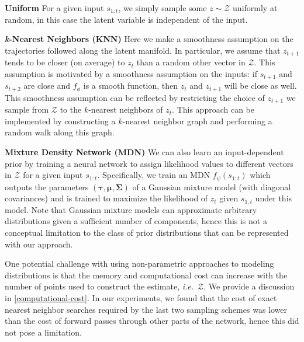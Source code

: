 \documentclass{article}
\begin{document}


\textbf{Uniform} \quad
For a given input $s_{1:t}$, we simply sample some $z \sim \mathcal{Z}$ uniformly at random, in this case the latent variable is independent of the input.

\textbf{\emph{k}-Nearest Neighbors (KNN)} \quad
Here we make a smoothness assumption on the trajectories followed along the latent manifold.
In particular, we assume that $z_{t+1}$ tends to be closer (on average) to $z_t$ than a random other vector in $\mathcal{Z}$.
This assumption is motivated by a smoothness assumption on the inputs: if $s_{t+1}$ and $s_{t+2}$ are close and $f_\phi$ is a smooth function, then $z_t$ and $z_{t+1}$ will be close as well.
This smoothness assumption can be reflected by restricting the choice of $z_{t+1}$ we sample from $\mathcal{Z}$ to the $k$-nearest neighbors of $z_t$.
This approach can be implemented by constructing a $k$-nearest neighbor graph and performing a random walk along this graph.

\textbf{Mixture Density Network (MDN)} \quad
We can also learn an input-dependent prior by training a neural network to assign likelihood values to different vectors in $\mathcal{Z}$ for a given input $s_{1:t}$.
Specifically, we train an MDN \citep{mixture-density-networks} $f_\psi(s_{1:t})$ which outputs the parameters $(\bm{\tau}, \bm{\mu}, \bm{\Sigma})$ of a Gaussian mixture model (with diagonal covariances) and is trained to maximize the likelihood of $z_t$ given $s_{1:t}$ under this model.
Note that Gaussian mixture models can approximate arbitrary distributions given a sufficient number of components, hence this is not a conceptual limitation to the class of prior distributions that can be represented with our approach.

One potential challenge with using non-parametric approaches to modeling distributions is that the memory and computational cost can increase with the number of points used to construct the estimate, \emph{i.e.}\ $\mathcal{Z}$.
We provide a discussion in \cref{computational-cost}.
In our experiments, we found that the cost of exact nearest neighbor searches required by the last two sampling schemes was lower than the cost of forward passes through other parts of the network, hence this did not pose a limitation.
\end{document}

